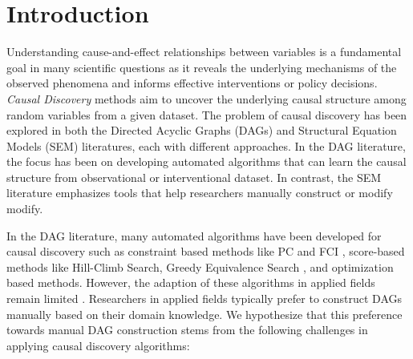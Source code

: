 \documentclass[letterpaper]{article} %
\begin{document}
\section{Introduction}

Understanding cause-and-effect relationships between variables is a fundamental
goal in many scientific questions as it reveals the underlying mechanisms of
the observed phenomena and informs effective interventions or policy decisions.
\emph{Causal Discovery} methods aim to uncover the underlying causal structure
among random variables from a given dataset. The problem of causal discovery
has been explored in both the Directed Acyclic Graphs (DAGs) and Structural
Equation Models (SEM) literatures, each with different approaches. In the DAG
literature, the focus has been on developing automated algorithms that can
learn the causal structure from observational or interventional dataset. In
contrast, the SEM literature emphasizes tools that help researchers manually
construct or modify modify.


In the DAG literature, many automated algorithms have been developed for causal
discovery such as constraint based methods like PC \citep{Spirtes2001} and FCI
\citep{Spirtes2000}, score-based methods like Hill-Climb Search, Greedy
Equivalence Search \citep{Chickering2002}, and optimization based methods.
However, the adaption of these algorithms in applied fields remain limited
\citep{Tennant2020}. Researchers in applied fields typically prefer to
construct DAGs manually based on their domain knowledge. We hypothesize that
this preference towards manual DAG construction stems from the following
challenges in applying causal discovery algorithms: 
\end{document}
